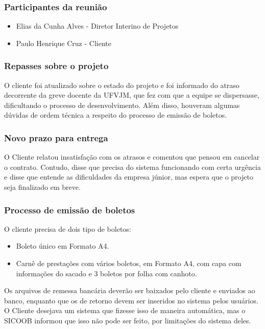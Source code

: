 \documentclass[a4paper, 12pt]{article}
\begin{document}
\subsubsection*{Participantes da reunião}
\begin{itemize}
	\item Elias da Cunha Alves - Diretor Interino de Projetos
	\item Paulo Henrique Cruz - Cliente
\end{itemize}

\subsubsection*{Repasses sobre o projeto}
O cliente foi atualizado sobre o estado do projeto e foi informado do atraso decorrente da greve docente da UFVJM, que fez com que a equipe se dispersasse, dificultando o processo de desenvolvimento. Além disso, houveram algumas dúvidas de ordem técnica a respeito do processo de emissão de boletos.

\subsubsection*{Novo prazo para entrega}
O Cliente relatou insatisfação com os atrasos e comentou que pensou em cancelar o contrato.
Contudo, disse que precisa do sistema funcionando com certa urgência e disse que entende as dificuldades da empresa júnior, mas espera que o projeto seja finalizado em breve.

\subsubsection*{Processo de emissão de boletos}
O cliente precisa de dois tipo de boletos:
\begin{itemize}
	\item Boleto único em Formato A4.
	\item Carnê de prestações com vários boletos, em Formato A4, com capa com informações do sacado e 3 boletos por folha com canhoto.
\end{itemize}

Os arquivos de remessa bancária deverão ser baixados pelo cliente e enviados ao banco, enquanto que os de retorno devem ser inseridos no sistema pelos usuários.
O Cliente desejava um sistema que fizesse isso de maneira automática, mas o SICOOB informou que isso não pode ser feito, por limitações do sistema deles.
 
\end{document}
